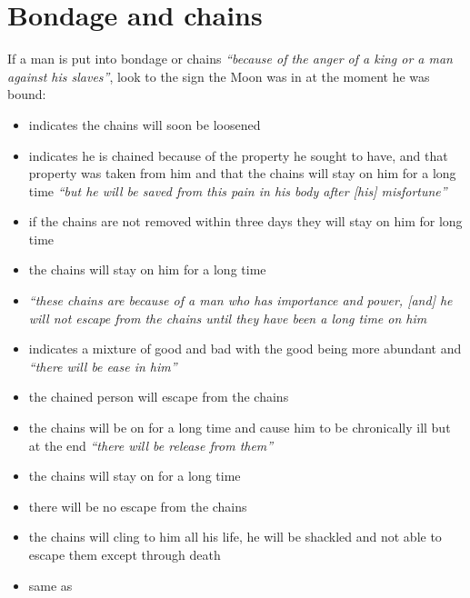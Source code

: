 \section{Bondage and chains}
If a man is put into bondage or chains \textsl{``because of the anger of a king or a man against his slaves''}, look to the sign the Moon was in at the moment he was bound:
\begin{itemize}[topsep=0em,itemsep=0em]
\item[\Aries] indicates the chains will soon be loosened

\item[\Taurus] indicates he is chained because of the property he sought to have, and that property was taken from him and that the chains will stay on him for a long time \textsl{``but he will be saved from this pain in his body after [his] misfortune''}

\item[\Gemini] if the chains are not removed within three days they will stay on him for  long time

\item[\Cancer] the chains will stay on him for a long time

\item[\Leo] \textsl{``these chains are because of a man who has importance and power, [and] he will not escape from the chains until they have been a long time on him}

\item[\Virgo] indicates a mixture of good and bad with the good being more abundant and \textsl{``there will be ease in him''}

\item[\Libra] the chained person will escape from the chains

\item[\Scorpio] the chains will be on for a long time and cause him to be chronically ill but at the end \textsl{``there will be release from them''}

\item[\Sagittarius] the chains will stay on for a long time

\item[\Capricorn] there will be no escape from the chains

\item[\Aquarius] the chains will cling to him all his life, he will be shackled and not able to escape them except through death

\item[\Pisces] same as \Aquarius

\end{itemize}

